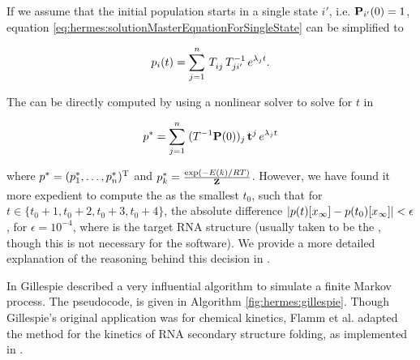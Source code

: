 \documentclass[11pt, oneside]{Thesis} %
\begin{document}
If we assume that the initial population starts in a single state $i'$,
i.e. $\mbox{\bf P}_{i'}(0) = 1$, equation
\ref{eq:hermes:solutionMasterEquationForSingleState} can be simplified to

\begin{align}
\label{eq:hermes:solutionMasterEquationForSingleStateFixedStartPop}
p_i(t) = \sum_{j=1}^n\, T_{ij}^{\vphantom{-1}}\, T_{ji'}^{-1}\, e^{\lambda_j t}.
\end{align}

The {\em \eqt} can be directly computed by using a
nonlinear solver to solve for $t$ in

\begin{align}
\label{eq:hermes:solutionEquilibriumTime}
\pSt = \sum_{j=1}^n\; (T^{-1}
\mathbbP(0))_j\, \mathbbt^j\, e^{\lambda_j t}
\end{align}

where $p^*=(p^*_1,\dots,p^*_n)^{\text T}$ and $p^*_k = \frac{\exp(-E(k)/RT)}{{\bf Z}^{}_{}}$.
However, we have found it more
expedient to compute the {\em \eqt} as the smallest $t_0$,
such that for $t \in \{t_0+1,t_0+2,t_0+3,t_0+4\}$, the absolute difference
$|p(t)[x_\infty] - p(t_0)[x_\infty]| < \epsilon$, for $\epsilon =
10^{-4}$, where \xEnd is the target RNA structure (usually taken
to be the \mfes, though this is not necessary for
the software). We provide a more detailed explanation of the reasoning behind
this decision in .

In \citep{gillespiestochasticsimulation1} Gillespie described
a very influential algorithm to simulate a finite Markov process.
The pseudocode, is given in Algorithm \ref{fig:hermes:gillespie}.
Though Gillespie's original application was for chemical kinetics,
Flamm et al. adapted the method for the kinetics of RNA secondary structure
folding, as implemented in \kinfold \citep{flammphd,flamm}.
\medskip
\end{document}
